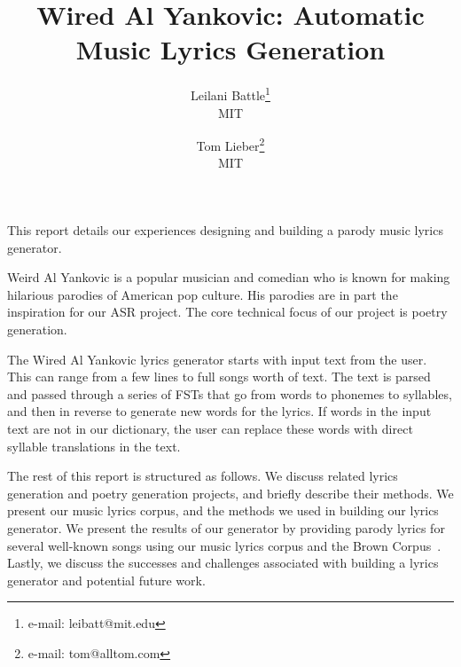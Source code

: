 \documentclass{vgtc}                          %
\title{Wired Al Yankovic: Automatic Music Lyrics Generation}
\author{Leilani Battle\thanks{e-mail: leibatt@mit.edu}\\ %
        \scriptsize MIT %
\and Tom Lieber\thanks{e-mail: tom@alltom.com}\\ %
     \scriptsize MIT}
\begin{document}


\maketitle

\label{sec:intro}
This report details our experiences designing and building a parody music lyrics generator.

Weird Al Yankovic is a popular musician and comedian who is known for making
hilarious parodies of American pop culture. His parodies are in part the inspiration for our ASR
project. The core technical focus of our project is poetry generation.

The Wired Al Yankovic lyrics generator starts with input text from the user. This
can range from a few lines to full songs worth of text. The text is parsed and passed
through a series of FSTs that go from words to phonemes to syllables, and then
in reverse to generate new words for the lyrics. If words in the input text
are not in our dictionary, the user can replace these words with direct
syllable translations in the text.

The rest of this report is structured as follows. We discuss related lyrics generation
and poetry generation projects, and briefly describe their methods. We present
our music lyrics corpus, and the methods we used in building our lyrics generator.
We present the results of our generator by providing parody lyrics for
several well-known songs using our music lyrics corpus
and the Brown Corpus~\cite{browncorpus}.
Lastly, we discuss the successes
and challenges associated with building a lyrics generator and potential
future work.
\end{document}

